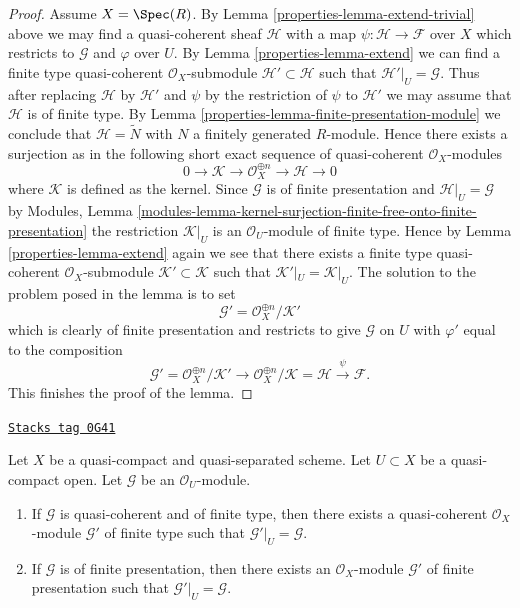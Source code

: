 \begin{proof}
\medskip\noindent
Assume $X = \Spec(R)$.
By Lemma \ref{properties-lemma-extend-trivial} above we may
find a quasi-coherent sheaf $\mathcal{H}$ with
a map $\psi : \mathcal{H} \to \mathcal{F}$ over $X$
which restricts to $\mathcal{G}$ and $\varphi$ over $U$.
By Lemma \ref{properties-lemma-extend} we can find a finite type
quasi-coherent $\mathcal{O}_X$-submodule
$\mathcal{H}' \subset \mathcal{H}$
such that $\mathcal{H}'|_U = \mathcal{G}$. Thus after
replacing $\mathcal{H}$ by $\mathcal{H}'$
and $\psi$ by the restriction of $\psi$ to $\mathcal{H}'$
we may assume that $\mathcal{H}$ is of finite type.
By Lemma \ref{properties-lemma-finite-presentation-module}
we conclude that $\mathcal{H} = \widetilde{N}$ with
$N$ a finitely generated $R$-module. Hence there exists a surjection
as in the following short exact sequence of
quasi-coherent $\mathcal{O}_X$-modules
$$
0 \to \mathcal{K} \to \mathcal{O}_X^{\oplus n} \to \mathcal{H} \to 0
$$
where $\mathcal{K}$ is defined as the kernel.
Since $\mathcal{G}$ is of finite presentation and
$\mathcal{H}|_U = \mathcal{G}$ by
Modules, Lemma
\ref{modules-lemma-kernel-surjection-finite-free-onto-finite-presentation}
the restriction $\mathcal{K}|_U$ is
an $\mathcal{O}_U$-module of finite type. Hence by Lemma \ref{properties-lemma-extend}
again we see that there exists a finite type quasi-coherent
$\mathcal{O}_X$-submodule $\mathcal{K}' \subset \mathcal{K}$ such
that $\mathcal{K}'|_U = \mathcal{K}|_U$. The solution to the problem
posed in the lemma is to set
$$
\mathcal{G}' = \mathcal{O}_X^{\oplus n}/\mathcal{K}'
$$
which is clearly of finite presentation and restricts to give $\mathcal{G}$
on $U$ with $\varphi'$ equal to the composition
$$
\mathcal{G}' = \mathcal{O}_X^{\oplus n}/\mathcal{K}'
\to \mathcal{O}_X^{\oplus n}/\mathcal{K} = \mathcal{H} \xrightarrow{\psi}
\mathcal{F}.
$$
This finishes the proof of the lemma.
\end{proof}

\begin{lemma}
\label{properties-lemma-lift-finite-presentation}
\href{https://stacks.math.columbia.edu/tag/0G41}{\texttt{Stacks tag 0G41}}

Let $X$ be a quasi-compact and quasi-separated scheme. Let $U \subset X$
be a quasi-compact open. Let $\mathcal{G}$ be an $\mathcal{O}_U$-module.
\begin{enumerate}
\item If $\mathcal{G}$ is quasi-coherent and of finite type, then
there exists a quasi-coherent $\mathcal{O}_X$-module $\mathcal{G}'$
of finite type such that $\mathcal{G}'|_U = \mathcal{G}$.
\item If $\mathcal{G}$ is of finite presentation, then
there exists an $\mathcal{O}_X$-module $\mathcal{G}'$
of finite presentation such that $\mathcal{G}'|_U = \mathcal{G}$.
\end{enumerate}
\end{lemma}

